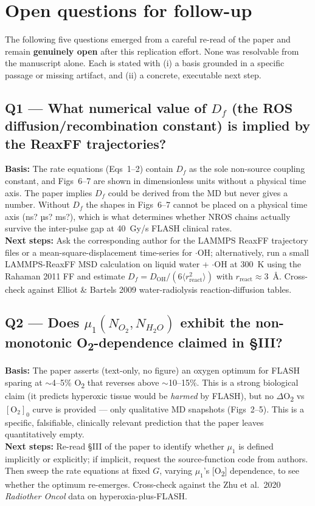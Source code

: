 \section{Open questions for follow-up}

The following five questions emerged from a careful re-read of the paper and remain \textbf{genuinely open} after this replication effort. None was resolvable from the manuscript alone. Each is stated with (i) a basis grounded in a specific passage or missing artifact, and (ii) a concrete, executable next step.

\subsection*{Q1 --- What numerical value of $D_f$ (the ROS diffusion/recombination constant) is implied by the ReaxFF trajectories?}
\textbf{Basis:} The rate equations (Eqs~1--2) contain $D_f$ as the sole non-source coupling constant, and Figs~6--7 are shown in dimensionless units without a physical time axis. The paper implies $D_f$ could be derived from the MD but never gives a number. Without $D_f$ the shapes in Figs~6--7 cannot be placed on a physical time axis (ns? µs? ms?), which is what determines whether NROS chains actually survive the inter-pulse gap at 40~Gy/s FLASH clinical rates.\\
\textbf{Next steps:} Ask the corresponding author for the LAMMPS ReaxFF trajectory files or a mean-square-displacement time-series for $\cdot$OH; alternatively, run a small LAMMPS-ReaxFF MSD calculation on liquid water + $\cdot$OH at 300~K using the Rahaman 2011 FF and estimate $D_f = D_{\text{OH}}/(6\langle r_{\text{react}}^2\rangle)$ with $r_{\text{react}} \approx 3$~\AA. Cross-check against Elliot \& Bartels 2009 water-radiolysis reaction-diffusion tables.

\subsection*{Q2 --- Does $\mu_1(N_{O_2}, N_{H_2O})$ exhibit the non-monotonic O\textsubscript{2}-dependence claimed in \S III?}
\textbf{Basis:} The paper asserts (text-only, no figure) an oxygen optimum for FLASH sparing at $\sim$4--5\% O\textsubscript{2} that reverses above $\sim$10--15\%. This is a strong biological claim (it predicts hyperoxic tissue would be \emph{harmed} by FLASH), but no $\Delta$O\textsubscript{2} vs $[\text{O}_2]_0$ curve is provided --- only qualitative MD snapshots (Figs~2--5). This is a specific, falsifiable, clinically relevant prediction that the paper leaves quantitatively empty.\\
\textbf{Next steps:} Re-read \S III of the paper to identify whether $\mu_1$ is defined implicitly or explicitly; if implicit, request the source-function code from authors. Then sweep the rate equations at fixed $G$, varying $\mu_1$'s [O\textsubscript{2}] dependence, to see whether the optimum re-emerges. Cross-check against the Zhu et al.\ 2020 \emph{Radiother Oncol} data on hyperoxia-plus-FLASH.

